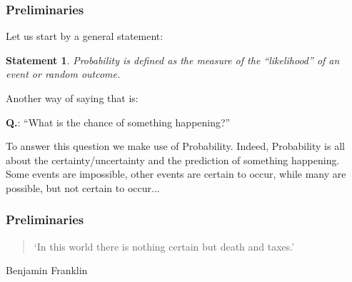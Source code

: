 \documentclass[notes=show,handout]{beamer}
\newtheorem{statement}{Statement}[section]
\begin{document}
\begin{frame}
\frametitle{Preliminaries}
Let us start by a general statement:

\vspace{0.35cm}
\begin{statement}
Probability is defined as the measure of the ``likelihood'' of an event or random outcome. \\
\end{statement}


\vspace{0.35cm}

Another way of saying that is: \\ \vspace{0.25cm}

\begin{center}
\color{red}\textbf{Q.}: ``What is the chance of something happening?'' \color{black}
\end{center}

\vspace{0.35cm}


To answer this question we make use of Probability. Indeed, Probability is all about the certainty/uncertainty and the prediction of something 
happening. Some events are impossible, other events are certain to occur, while many are possible, but not certain to occur...

\end{frame}

\begin{frame}
\frametitle{Preliminaries}


\vspace{1.25cm}

\begin{quote}
 {\Large `In this world there is nothing certain but death and taxes.'}\\
\end{quote}

\vspace{1.25cm}
\vspace{2.25cm}

\begin{flushright}
{Benjamin Franklin}
\end{flushright}



\end{frame}
\end{document}
